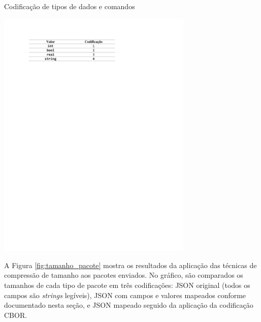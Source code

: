 \begin{table}[hp]	
	\centering
	\caption{Codificação de tipos de dados e comandos}\smallskip
	\label{tab:cod_type_category}
	\includegraphics[width=0.7\textwidth]{tabelas/cod_type_category.pdf}
\end{table}

\clearpage
A Figura \ref{fig:tamanho_pacote} mostra os resultados da aplicação das técnicas de compressão de tamanho aos pacotes enviados. No gráfico, são comparados os tamanhos de cada tipo de pacote em três codificações: JSON original (todos os campos são \textit{strings} legíveis), JSON com campos e valores mapeados conforme documentado nesta seção, e JSON mapeado seguido da aplicação da codificação CBOR.

